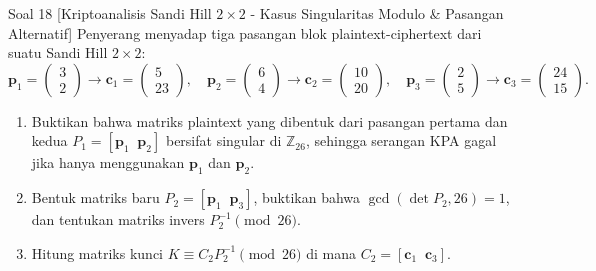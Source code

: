 \documentclass[11pt,a4paper]{article}
\begin{document}
\begin{soalanalisis}{Soal 18 [Kriptoanalisis Sandi Hill $2 \times 2$ - Kasus Singularitas Modulo \& Pasangan Alternatif]}
Penyerang menyadap tiga pasangan blok plaintext-ciphertext dari suatu Sandi Hill $2 \times 2$:
\[
\mathbf{p}_1 = \begin{pmatrix} 3 \\ 2 \end{pmatrix} \to \mathbf{c}_1 = \begin{pmatrix} 5 \\ 23 \end{pmatrix}, \quad \mathbf{p}_2 = \begin{pmatrix} 6 \\ 4 \end{pmatrix} \to \mathbf{c}_2 = \begin{pmatrix} 10 \\ 20 \end{pmatrix}, \quad \mathbf{p}_3 = \begin{pmatrix} 2 \\ 5 \end{pmatrix} \to \mathbf{c}_3 = \begin{pmatrix} 24 \\ 15 \end{pmatrix}.
\]
\begin{enumerate}[label=(\alph*)]
    \item Buktikan bahwa matriks plaintext yang dibentuk dari pasangan pertama dan kedua $P_1 = [\mathbf{p}_1 \;\; \mathbf{p}_2]$ bersifat singular di $\mathbb{Z}_{26}$, sehingga serangan KPA gagal jika hanya menggunakan $\mathbf{p}_1$ dan $\mathbf{p}_2$.
    \item Bentuk matriks baru $P_2 = [\mathbf{p}_1 \;\; \mathbf{p}_3]$, buktikan bahwa $\gcd(\det P_2, 26) = 1$, dan tentukan matriks invers $P_2^{-1} \pmod{26}$.
    \item Hitung matriks kunci $K \equiv C_2 P_2^{-1} \pmod{26}$ di mana $C_2 = [\mathbf{c}_1 \;\; \mathbf{c}_3]$.
\end{enumerate}
\end{soalanalisis}
\end{document}

